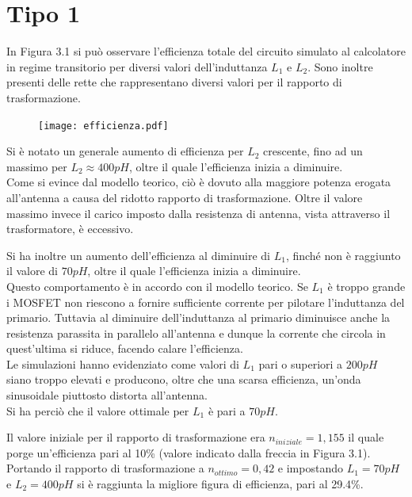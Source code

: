 \documentclass[a4paper, 12pt]{memoir}
\begin{document}
\section{Tipo 1}
In Figura 3.1 si può osservare l'efficienza totale del circuito simulato al
calcolatore in regime transitorio per diversi valori dell'induttanza $L_1$ e
$L_2$. Sono inoltre presenti delle rette che rappresentano diversi valori per 
il rapporto di trasformazione.

\begin{figure}[h!]
\centering
\texttt{[image: efficienza.pdf]}
\caption{}
\end{figure}

Si è notato un generale aumento di efficienza per $L_2$ crescente, fino ad un
massimo per $L_2 \approx 400pH$, oltre il quale l'efficienza inizia a
diminuire.\\
Come si evince dal modello teorico, ciò è dovuto alla maggiore potenza erogata
all'antenna a causa del ridotto rapporto di trasformazione. Oltre il valore
massimo invece il carico imposto dalla resistenza di antenna, vista attraverso
il trasformatore, è eccessivo.

Si ha inoltre un aumento dell'efficienza al diminuire di $L_1$, finché non è
raggiunto il valore di $70pH$, oltre il quale l'efficienza inizia a diminuire.
\\Questo comportamento è in accordo con il modello teorico. Se $L_1$ è
troppo grande i MOSFET non riescono a fornire sufficiente corrente per
pilotare l'induttanza del primario. Tuttavia al diminuire dell'induttanza al
primario diminuisce anche la resistenza parassita in parallelo all'antenna e
dunque la corrente che circola in quest'ultima si riduce, facendo calare
l'efficienza.\\
Le simulazioni hanno evidenziato come valori di $L_1$ pari o superiori a $200pH$
siano troppo elevati e producono, oltre che una scarsa efficienza, un'onda
sinusoidale piuttosto distorta all'antenna.\\
Si ha perciò che il valore ottimale per $L_1$ è pari a $70pH$.

Il valore iniziale per il rapporto di trasformazione era $n_{iniziale}=1,155$
il quale porge un'efficienza pari al 10\% (valore indicato dalla freccia in
Figura 3.1).\\
Portando il rapporto di trasformazione a $n_{ottimo}=0,42$ e impostando
$L_1=70pH$ e $L_2=400pH$ si è raggiunta la migliore figura di efficienza, pari
al 29.4\%.
\end{document}

